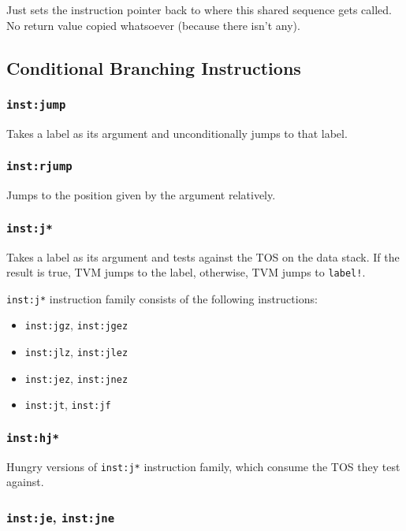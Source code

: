 \documentclass{article}
\newcommand{\inst}[1] {\texttt{inst:#1}}
\begin{document}
Just sets the instruction pointer back to where this shared sequence gets called. No return value copied whatsoever (because there isn't any).

\subsection{Conditional Branching Instructions}

\subsubsection{\inst{jump}}

Takes a label as its argument and unconditionally jumps to that label.

\subsubsection{\inst{rjump}}

Jumps to the position given by the argument relatively.

\subsubsection{\inst{j*}}

Takes a label as its argument and tests against the TOS on the data stack. If the result is true, TVM jumps to the label, otherwise, TVM jumps to \texttt{label!}.

\inst{j*} instruction family consists of the following instructions:
\begin{itemize}
\item \inst{jgz}, \inst{jgez}
\item \inst{jlz}, \inst{jlez}
\item \inst{jez}, \inst{jnez}
\item \inst{jt}, \inst{jf}
\end{itemize}

\subsubsection{\inst{hj*}}

Hungry versions of \inst{j*} instruction family, which consume the TOS they test against.

\subsubsection{\inst{je}, \inst{jne}}
\end{document}
